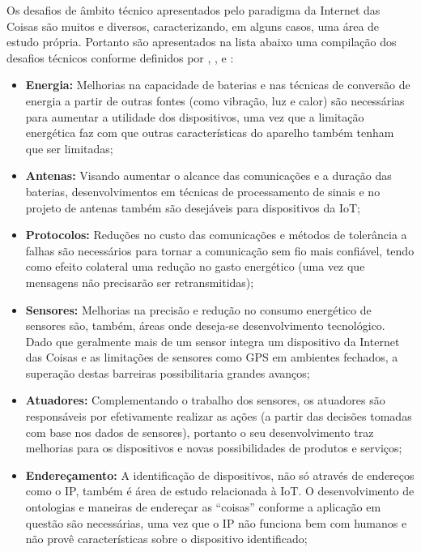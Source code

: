 \documentclass[twoside,english,brazilian]{UNISINOSmonografia}
\begin{document}
Os desafios de âmbito técnico apresentados pelo paradigma da Internet das 
Coisas são muitos e diversos, caracterizando, em alguns casos, uma área de 
estudo própria. Portanto são apresentados na lista abaixo uma compilação dos 
desafios técnicos conforme definidos por 
, 
, 
 e 
:

\begin{itemize}
	
	\item \textbf{Energia:}
Melhorias na capacidade de baterias e nas técnicas de conversão de energia a 
partir de outras fontes (como vibração, luz e calor) são necessárias para 
aumentar a utilidade dos dispositivos, uma vez que a limitação energética faz 
com que outras características do aparelho também tenham que ser limitadas;
	
	\item \textbf{Antenas:}
Visando aumentar o alcance das comunicações e a duração das baterias, 
desenvolvimentos em técnicas de processamento de sinais e no projeto de 
antenas também são desejáveis para dispositivos da IoT;
	
	\item \textbf{Protocolos:}
Reduções no custo das comunicações e métodos de tolerância a falhas são 
necessários para tornar a comunicação sem fio mais confiável, tendo como 
efeito colateral uma redução no gasto energético (uma vez que mensagens não 
precisarão ser retransmitidas);
	
	\item \textbf{Sensores:}
Melhorias na precisão e redução no consumo energético de sensores são, também, 
áreas onde deseja-se desenvolvimento tecnológico. Dado que geralmente mais de 
um sensor integra um dispositivo da Internet das Coisas e as limitações de 
sensores como GPS em ambientes fechados, a superação destas barreiras 
possibilitaria grandes avanços;
	
	\item \textbf{Atuadores:}
Complementando o trabalho dos sensores, os atuadores são responsáveis por 
efetivamente realizar as ações (a partir das decisões tomadas com base nos 
dados de sensores), portanto o seu desenvolvimento traz melhorias para os 
dispositivos e novas possibilidades de produtos e serviços;
	
	\item \textbf{Endereçamento:}
A identificação de dispositivos, não só através de endereços como o IP, também 
é área de estudo relacionada à IoT. O desenvolvimento de ontologias e maneiras 
de endereçar as ``coisas'' conforme a aplicação em questão são necessárias, 
uma vez que o IP não funciona bem com humanos e não provê características 
sobre o dispositivo identificado;
	

\end{itemize}
\end{document}
